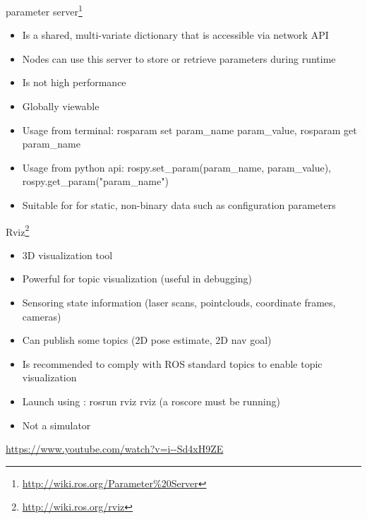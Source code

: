 \documentclass{beamer}
\begin{document}
\begin{frame}{parameter server\footnote{\url{http://wiki.ros.org/Parameter\%20Server}}}
	\begin{itemize}
		\item Is a shared, multi-variate dictionary that is accessible via network API
		\item Nodes can use this server to store or retrieve parameters during runtime
		\item Is not high performance
		\item Globally viewable
		\item Usage from terminal: rosparam set param\_name param\_value, rosparam get param\_name
		\item Usage from python api: rospy.set\_param(param\_name, param\_value), rospy.get\_param("param\_name")
		\item Suitable for for static, non-binary data such as configuration parameters
	\end{itemize}
	
\end{frame}


\begin{frame}{Rviz\footnote{\url{http://wiki.ros.org/rviz}}}
	
	\begin{itemize}
		\item 3D visualization tool
		\item Powerful for topic visualization (useful in debugging)
		\item Sensoring state information (laser scans, pointclouds, coordinate frames, cameras)
		\item Can publish some topics (2D pose estimate, 2D nav goal)
		\item Is recommended to comply with ROS standard topics to enable topic visualization
		\item Launch using : rosrun rviz rviz (a roscore must be running)
		\item Not a simulator
	\end{itemize}
	
	\centering
	\url{https://www.youtube.com/watch?v=i--Sd4xH9ZE}
	
\end{frame}


%	
%	
\end{document}
